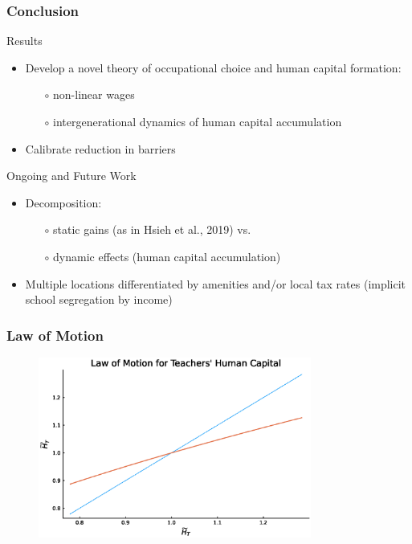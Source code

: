 \documentclass[11pt]{beamer}
\begin{document}
\begin{frame}
	\frametitle{Conclusion}
	\textcolor{tblue}{Results}
	\begin{itemize}
		\item Develop a novel theory of occupational choice and human capital formation: 
		\begin{itemize}
			\item[$\circ$] non-linear wages %
			\item[$\circ$] intergenerational dynamics of human capital accumulation
		\end{itemize}
		\item Calibrate reduction in barriers
	\end{itemize}
	\textcolor{tblue}{Ongoing and Future Work}
	\begin{itemize}	
		\item Decomposition:
		\begin{itemize}
			\item[$\circ$] static gains (as in Hsieh et al., 2019) vs.
			\item[$\circ$] dynamic effects (human capital accumulation)
		\end{itemize}
		\item Multiple locations differentiated by amenities and/or local tax rates (implicit school segregation by income)
	\end{itemize}
\end{frame}

\begin{frame}
	\frametitle{Law of Motion}
	\begin{figure}
		\begin{center}
			\includegraphics[width=0.8\textwidth]{plots/LoM.eps}
			\label{ }
		\end{center}
	\end{figure}
\end{frame}
\end{document}
